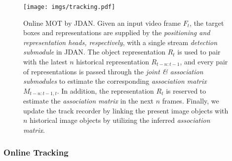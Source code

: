 \documentclass[acmsmall]{acmart}
\begin{document}
\begin{figure}[t]
	\centering
	\texttt{[image: imgs/tracking.pdf]}
	\caption{
		Online MOT by JDAN. 
		Given an input video frame $F_t$, the target boxes and representations are supplied by the \emph{\emph{positioning} and \emph{representation heads}, respectively}, with a single stream \emph{detection submodule} in JDAN. 
		The object representation $R_t$ is used to pair with the latest $n$ historical representation $R_{t-n:t-1}$, 
		and every pair of representations is passed through the \emph{joint \& association submodules} to estimate the corresponding \emph{association matrix} $M_{t-n:t-1,t}$. 
		In addition, the representation $R_t$ is reserved to estimate the \emph{association matrix} in the next $n$ frames. 
		Finally, we update the track recorder by linking the present image objects with $n$ historical image objects by utilizing the inferred \emph{association matrix}. 
	}
	\label{fig:tracking}
\end{figure}


\subsubsection{Online Tracking}
\end{document}
